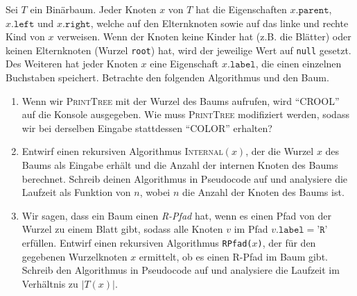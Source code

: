 \documentclass{uebung_cs}
\begin{document}
\begin{aufgabe}
	Sei $T$ ein Binärbaum.
	Jeder Knoten $x$ von $T$ hat die Eigenschaften $x.\texttt{parent}$, $x.\texttt{left}$ und $x.\texttt{right}$, welche auf den Elternknoten sowie auf das linke und rechte Kind von $x$ verweisen.
	Wenn der Knoten keine Kinder hat (z.B. die Blätter) oder keinen Elternknoten (Wurzel \texttt{root}) hat, wird der jeweilige Wert auf \texttt{null} gesetzt.
	Des Weiteren hat jeder Knoten $x$ eine Eigenschaft $x.\texttt{label}$, die einen einzelnen Buchstaben speichert.
	Betrachte den folgenden Algorithmus und den Baum.
	\begin{algorithmic}
			\EndIf
			\EndIf
		\EndIf
		\EndProcedure
	\end{algorithmic}
	\begin{center}
	\end{center}
	\begin{enumerate}
		\item Wenn wir \textsc{PrintTree} mit der Wurzel des Baums aufrufen, wird \enquote{CROOL} auf die Konsole ausgegeben.
		Wie muss \textsc{PrintTree} modifiziert werden, sodass wir bei derselben Eingabe stattdessen \enquote{COLOR} erhalten?
		\item Entwirf einen rekursiven Algorithmus \textsc{Internal}$(x)$, der die Wurzel $x$ des Baums als Eingabe erhält und die Anzahl der internen Knoten des Baums berechnet.
		Schreib deinen Algorithmus in Pseudocode auf und analysiere die Laufzeit als Funktion von $n$, wobei $n$ die Anzahl der Knoten des Baums ist.
		\item Wir sagen, dass ein Baum einen \textit{R-Pfad} hat, wenn es einen Pfad von der Wurzel zu einem Blatt gibt, sodass alle Knoten $v$ im Pfad $v.\texttt{label} = \texttt{'R'}$ erfüllen.
		Entwirf einen rekursiven Algorithmus \texttt{RPfad($x$)}, der für den gegebenen Wurzelknoten $x$ ermittelt, ob es einen R-Pfad im Baum gibt.
		Schreib den Algorithmus in Pseudocode auf und analysiere die Laufzeit im Verhältnis zu $|T(x)|$.
	\end{enumerate}
\end{aufgabe}
\end{document}
